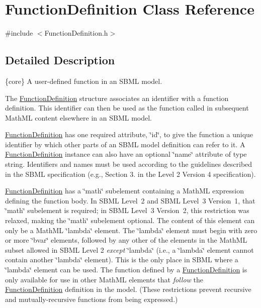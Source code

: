 \hypertarget{class_function_definition}{}\section{Function\+Definition Class Reference}
\label{class_function_definition}


{\ttfamily \#include $<$Function\+Definition.\+h$>$}



\subsection{Detailed Description}
\{core\} A user-\/defined function in an S\+B\+ML model.

The \hyperlink{class_function_definition}{Function\+Definition} structure associates an identifier with a function definition. This identifier can then be used as the function called in subsequent Math\+ML content elsewhere in an S\+B\+ML model.

\hyperlink{class_function_definition}{Function\+Definition} has one required attribute, \char`\"{}id\char`\"{}, to give the function a unique identifier by which other parts of an S\+B\+ML model definition can refer to it. A \hyperlink{class_function_definition}{Function\+Definition} instance can also have an optional \char`\"{}name\char`\"{} attribute of type {\ttfamily string}. Identifiers and names must be used according to the guidelines described in the S\+B\+ML specification (e.\+g., Section 3. in the Level 2 Version 4 specification).

\hyperlink{class_function_definition}{Function\+Definition} has a \char`\"{}math\char`\"{} subelement containing a Math\+ML expression defining the function body. In S\+B\+ML Level~2 and S\+B\+ML Level~3 Version~1, that \char`\"{}math\char`\"{} subelement is required; in S\+B\+ML Level~3 Version~2, this restriction was relaxed, making the \char`\"{}math\char`\"{} subelement optional. The content of this element can only be a Math\+ML \char`\"{}lambda\char`\"{} element. The \char`\"{}lambda\char`\"{} element must begin with zero or more \char`\"{}bvar\char`\"{} elements, followed by any other of the elements in the Math\+ML subset allowed in S\+B\+ML Level 2 {\itshape except} \char`\"{}lambda\char`\"{} (i.\+e., a \char`\"{}lambda\char`\"{} element cannot contain another \char`\"{}lambda\char`\"{} element). This is the only place in S\+B\+ML where a \char`\"{}lambda\char`\"{} element can be used. The function defined by a \hyperlink{class_function_definition}{Function\+Definition} is only available for use in other Math\+ML elements that {\itshape follow} the \hyperlink{class_function_definition}{Function\+Definition} definition in the model. (These restrictions prevent recursive and mutually-\/recursive functions from being expressed.)

